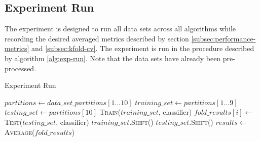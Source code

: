 \subsection{Experiment Run} \label{subsec:experiment-run}
The experiment is designed to run all data sets across all algorithms while recording the desired averaged metrics described by section \ref{subsec:performance-metrics} and \ref{subsec:kfold-cv}.
The experiment is run in the procedure described by algorithm \ref{alg:exp-run}.
Note that the data sets have already been pre-processed.

\begin{algorithm}[tbh]
\caption{Experiment Run}\label{alg:exp-run}
\begin{algorithmic}[1]
    	\State $partitions \gets data\_set\_partitions[1...10]$
            	\State $training\_set \gets partitions[1...9]$
                \State $testing\_set \gets partitions[10]$
                \State \textsc{Train}($training\_set$, classifier)
                \State $fold\_results[i] \gets $ \textsc{Test}($testing\_set$, classifier) 
                \State $training\_set.$\textsc{Shift()}
                \State $testing\_set.$\textsc{Shift()}
            \EndLoop
            \State $results \gets $ \textsc{Average}($fold\_results$)
        \EndFor
    \EndFor
\EndProcedure
\end{algorithmic}
\end{algorithm}